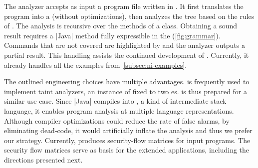The \tool analyzer accepts as input a program file written in
\texttt{}. It first translates the program into a 
(without optimizations), then analyzes the tree based on the rules of \lname.
The analysis is recursive over the methods of a \texttt{} class.
Obtaining a sound result requires a \prc|Java| method fully expressible in the
\lname {} (\autoref{fig:grammar}). Commands that are not covered are
highlighted by \tool and the analyzer outputs a partial result. This handling
assists the continued development of \lname. Currently, it already handles all
the examples from~\autoref{subsec:ni-examples}.

The outlined engineering choices have multiple advantages. \texttt{}
is frequently used to implement taint analyzers, an
instance of  fixed to two es. \tool is
thus prepared for a similar use case. Since \prc|Java| compiles into
, a kind of intermediate stack language, it
enables program analysis at multiple language representations. Although compiler
optimizations could reduce the rate of false alarms, \eg by eliminating
dead-code, it would artificially inflate the analysis  and thus we
prefer our strategy. Currently, \tool produces security-flow
matrices for input programs. The security flow
matrices serve as basis for the extended applications, including the directions
presented next.


